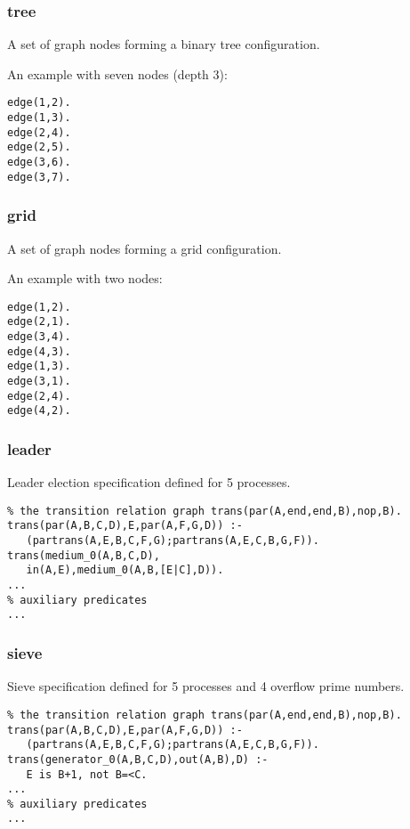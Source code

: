 \subsubsection*{tree}

A set of graph nodes forming a binary tree configuration.

An example with seven nodes (depth 3):

\begin{Verbatim}
edge(1,2).
edge(1,3).
edge(2,4).
edge(2,5).
edge(3,6).
edge(3,7).
\end{Verbatim}

\subsubsection*{grid}

A set of graph nodes forming a grid configuration.

An example with two nodes:

\begin{Verbatim}
edge(1,2).
edge(2,1).
edge(3,4).
edge(4,3).
edge(1,3).
edge(3,1).
edge(2,4).
edge(4,2).
\end{Verbatim}

\subsubsection*{leader}

Leader election specification defined for 5 processes.

\begin{Verbatim}
% the transition relation graph trans(par(A,end,end,B),nop,B).
trans(par(A,B,C,D),E,par(A,F,G,D)) :-
   (partrans(A,E,B,C,F,G);partrans(A,E,C,B,G,F)).
trans(medium_0(A,B,C,D),
   in(A,E),medium_0(A,B,[E|C],D)).
...
% auxiliary predicates
...
\end{Verbatim}

\subsubsection*{sieve}

Sieve specification defined for 5 processes and 4 overflow prime numbers.

\begin{Verbatim}
% the transition relation graph trans(par(A,end,end,B),nop,B).
trans(par(A,B,C,D),E,par(A,F,G,D)) :-
   (partrans(A,E,B,C,F,G);partrans(A,E,C,B,G,F)).
trans(generator_0(A,B,C,D),out(A,B),D) :-
   E is B+1, not B=<C.
...
% auxiliary predicates
...
\end{Verbatim}

